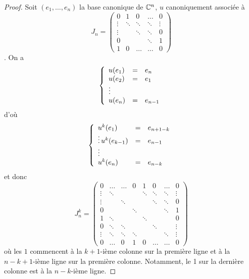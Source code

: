 \documentclass[12pt]{article}
\begin{document}
\begin{proof}
	Soit $(e_{1},\dots,e_{n})$ la base canonique de $\mathbb{C}^{n}$, $u$ canoniquement associée à 
	\begin{equation}
		J_{n}=
		\begin{pmatrix}
			0 & 1 & 0&\dots&0\\
			\vdots & \ddots & \ddots &\ddots& \vdots\\
			\vdots&&\ddots&\ddots&0\\
			0 &&&\ddots&1\\
			1 & 0&\dots &\dots&0
		\end{pmatrix}
	\end{equation}. On a 
	\begin{equation}
		\left\lbrace
			\begin{array}[]{lll}
				u(e_{1})&=&e_{n}\\
				u(e_{2})&=&e_{1}\\
				\vdots\\
				u(e_{n})&=&e_{n-1}
			\end{array}
		\right.
	\end{equation}
	d'où 
	\begin{equation}
		\left\lbrace
			\begin{array}[]{lll}
				u^{k}(e_{1})&=&e_{n+1-k}\\
				\vdots
				u^{k}(e_{k-1})&=&e_{n-1}\\
				\vdots\\
				u^{k}(e_{n})&=&e_{n-k}
			\end{array}
		\right.
	\end{equation}
	et donc 
	\begin{equation}
		J_{n}^{k}=
		\begin{pmatrix}
			0 & \dots & \dots&0 &1 &0&\dots &0\\
			\vdots&\ddots&&&\ddots&\ddots&\ddots&\vdots\\
			\vdots&&\ddots&&&\ddots&\ddots&0\\
			0&&&\ddots&&&\ddots&1\\
			1&\ddots&&&\ddots&&&0\\
			0&\ddots&\ddots&&&\ddots&&\vdots\\
			\vdots&\ddots&\ddots&\ddots&&&\ddots&\vdots\\
			0&\dots&0&1&0&\dots&\dots&0
		\end{pmatrix}
	\end{equation}
	où les $1$ commencent à la $k+1$-ième colonne sur la première ligne et à la $n-k+1$-ième ligne sur la première colonne. Notamment, le 1 sur la dernière colonne est à la $n-k$-ième ligne.


\end{proof}
\end{document}
